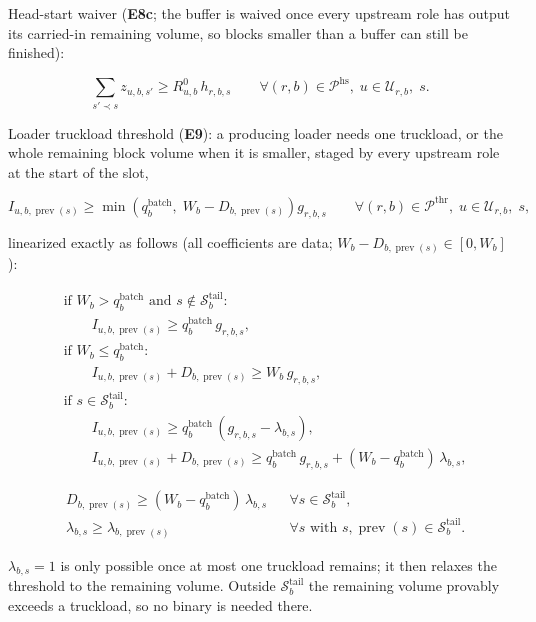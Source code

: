 Head-start waiver (\textbf{E8c}; the buffer is waived once every
upstream role has output its carried-in remaining volume, so blocks
smaller than a buffer can still be finished):

\[
\sum_{s'\prec s} z_{u,b,s'} \ge R^{0}_{u,b}\,h_{r,b,s}
\qquad \forall (r,b)\in\mathcal{P}^{\text{hs}},\; u\in\mathcal{U}_{r,b},\; s.
\]

Loader truckload threshold (\textbf{E9}): a producing loader needs one
truckload, or the whole remaining block volume when it is smaller,
staged by every upstream role at the start of the slot,

\[
I_{u,b,\operatorname{prev}(s)} \ge \min\!\left(q^{\text{batch}}_{b},\; W_b - D_{b,\operatorname{prev}(s)}\right) g_{r,b,s}
\qquad \forall (r,b)\in\mathcal{P}^{\text{thr}},\; u\in\mathcal{U}_{r,b},\; s,
\]

linearized exactly as follows (all coefficients are data;
\(W_b - D_{b,\operatorname{prev}(s)} \in [0, W_b]\)):

\[
\begin{aligned}
&\text{if } W_b > q^{\text{batch}}_b \text{ and } s\notin\mathcal{S}^{\text{tail}}_b:\\
&\qquad I_{u,b,\operatorname{prev}(s)} \ge q^{\text{batch}}_{b}\, g_{r,b,s},\\
&\text{if } W_b \le q^{\text{batch}}_b:\\
&\qquad I_{u,b,\operatorname{prev}(s)} + D_{b,\operatorname{prev}(s)} \ge W_b\, g_{r,b,s},\\
&\text{if } s\in\mathcal{S}^{\text{tail}}_b:\\
&\qquad I_{u,b,\operatorname{prev}(s)} \ge q^{\text{batch}}_{b}\,(g_{r,b,s}-\lambda_{b,s}),\\
&\qquad I_{u,b,\operatorname{prev}(s)} + D_{b,\operatorname{prev}(s)} \ge q^{\text{batch}}_{b}\, g_{r,b,s} + (W_b - q^{\text{batch}}_{b})\,\lambda_{b,s},
\end{aligned}
\]

\[
\begin{aligned}
&D_{b,\operatorname{prev}(s)} \ge (W_b - q^{\text{batch}}_{b})\,\lambda_{b,s}
&& \forall s\in\mathcal{S}^{\text{tail}}_b,\\
&\lambda_{b,s} \ge \lambda_{b,\operatorname{prev}(s)}
&& \forall s \text{ with } s,\operatorname{prev}(s)\in\mathcal{S}^{\text{tail}}_b.
\end{aligned}
\]

\(\lambda_{b,s}=1\) is only possible once at most one truckload remains;
it then relaxes the threshold to the remaining volume. Outside
\(\mathcal{S}^{\text{tail}}_b\) the remaining volume provably exceeds a
truckload, so no binary is needed there.

